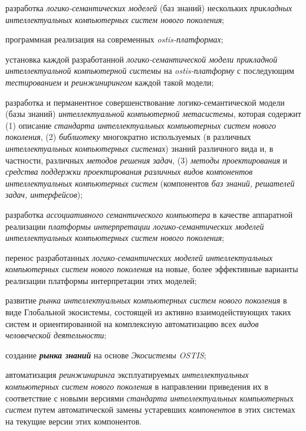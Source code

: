 \begin{textitemize}
	\begin{textitemize}
		\item
		разработка \textit{логико-семантических моделей} (баз знаний) нескольких \textit{прикладных интеллектуальных компьютерных систем нового поколения};
		\item
		программная реализация на современных \textit{ostis-платформах};
		\item
		установка каждой разработанной \textit{логико-семантической модели прикладной интеллектуальной компьютерной системы} на \textit{ostis-платформу} с последующим \textit{тестированием} и \textit{реинжинирингом} каждой такой модели;
		\item
		разработка и перманентное совершенствование логико-семантической модели (базы знаний) \textit{интеллектуальной компьютерной метасистемы}, которая содержит (1) описание \textit{стандарта интеллектуальных компьютерных систем нового поколения}, (2) \textit{библиотеку} многократно используемых (в различных \textit{интеллектуальных компьютерных системах}) знаний различного вида и, в частности, различных \textit{методов решения задач}, (3) \textit{методы проектирования} и \textit{средства поддержки проектирования} \textit{различных видов компонентов интеллектуальных компьютерных систем} (компонентов \textit{баз знаний, решателей задач, интерфейсов});
		\item
		разработка \textit{ассоциативного семантического компьютера} в качестве аппаратной реализации \textit{платформы интерпретации логико-семантических моделей интеллектуальных компьютерных систем нового поколения};
		\item
		перенос разработанных \textit{логико-семантических моделей интеллектуальных компьютерных систем нового поколения} на новые, более эффективные варианты реализации платформы интерпретации этих моделей;
		\item
		развитие \textit{рынка интеллектуальных компьютерных систем нового поколения} в виде Глобальной экосистемы, состоящей из активно взаимодействующих таких систем и ориентированной на комплексную автоматизацию всех \textit{видов} \textit{человеческой деятельности};
		\item
		создание \textbf{\textit{рынка знаний}} на основе \textit{Экосистемы OSTIS};
		\item
		автоматизация \textit{реинжиниринга} эксплуатируемых \textit{интеллектуальных компьютерных систем нового поколения} в направлении приведения их в соответствие с новыми версиями \textit{стандарта интеллектуальных компьютерны}х \textit{систем} путем автоматической замены устаревших \textit{компонентов} в этих системах на текущие версии этих компонентов.
	\end{textitemize}
\end{textitemize}

